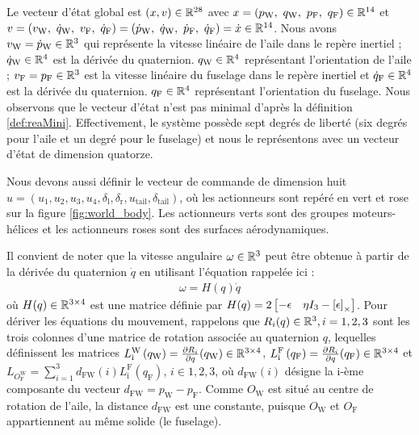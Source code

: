 Le vecteur d'état global est $(x,v) \in {\mathbb R}^{28}$ avec $x=(p_{\text{W}},~q_{\text{W}},~p_{\text{F}},~q_{\text{F}}) \in {\mathbb R}^{14}$ et $v=(v_{\text{W}},~\dot{q}_{\text{W}},~v_{\text{F}},~\dot{q}_{\text{F}}) = (\dot{p}_{\text{W}},~\dot{q}_{\text{W}},~\dot{p}_{\text{F}},~\dot{q}_{\text{F}})=\dot{x} \in {\mathbb R}^{14}$. Nous avons $v_{\text{W}} = \dot{p}_{\text{W}} \in {\mathbb R}^{3}$ qui représente la vitesse linéaire de l'aile dans le repère inertiel ; $\dot{q}_{\text{W}} \in {\mathbb R}^{4}$  est la dérivée du quaternion. $q_{\text{W}} \in {\mathbb R}^{4}$ représentant l'orientation de l'aile ; $v_{\text{F}} =p_{\text{F}} \in {\mathbb R}^{3}$  est la vitesse linéaire du fuselage dans le repère inertiel et $\dot{q}_{\text{F}} \in {\mathbb R}^{4}$  est la dérivée du quaternion. $q_{\text{F}} \in {\mathbb R}^{4}$ représentant l'orientation du fuselage. Nous observons que le vecteur d'état n'est pas minimal d'après la définition \ref{def:reaMini}. Effectivement, le système possède sept degrés de liberté (six degrés pour l'aile et un degré pour le fuselage) et nous le représentons avec un vecteur d'état de dimension quatorze.

Nous devons aussi définir le vecteur de commande de dimension huit $u = (u_{1},u_{2},u_{3},u_{4},\delta_{\text{l}},\delta_{\text{r}},u_{\text{tail}},\delta_{\text{tail}})$, où les actionneurs sont repéré en vert et rose sur la figure \ref{fig:world_body}. Les actionneurs verts sont des groupes moteurs-hélices et les actionneurs roses sont des surfaces aérodynamiques. 

Il convient de noter que la vitesse angulaire $\omega \in {\mathbb R}^{3}$ peut être obtenue à partir de la dérivée du quaternion $\dot{q}$ en utilisant l'équation \cite[équation (2.7)]{udwadia-schutte} rappelée ici : 
\begin{align*}
    \omega = H(q) \dot{q} 
\end{align*}
où $H(q) \in {\mathbb R}^{3\times4}$ est une matrice définie par $H(q) = 2\begin{bmatrix}-\epsilon & \eta I_{3} - \left[\epsilon\right]_{\times}\end{bmatrix}$.
Pour dériver les équations du mouvement, rappelons que  $R_{i}(q) \in {\mathbb R}^{3}, i = 1,2,3$ sont les trois colonnes d'une matrice de rotation associée au quaternion $q$, lequelles définissent les matrices $L_{\text{i}}^{\text{W}} \left( q_{\text{W}} \right) = \frac{\partial R_{i}}{\partial q}(q_{\text{W}}) \in {\mathbb R}^{3\times4}$, 
$L_{\text{i}}^{\text{F}} \left( q_{\text{F}} \right) = \frac{\partial R_{i}}{\partial q}(q_{\text{F}}) \in {\mathbb R}^{3\times4}$ et
$L_{O_{\text{F}}^{\text{W}}} = \sum_{i=1}^{3} d_{\text{FW}}(i) L_{\text{i}}^{\text{F}} (q_{\text{F}})$, $i \in {1,2,3}$, où $d_{\text{FW}}(i)$ désigne la i-ème composante du vecteur $d_{\text{FW}} = p_{\text{W}} - p_{\text{F}}$. Comme $O_{\text{W}}$ est situé au centre de rotation de l'aile, la distance $d_{\text{FW}}$ est une constante, puisque $O_{\text{W}}$ et $O_{\text{F}}$ appartiennent au même solide (le fuselage).

